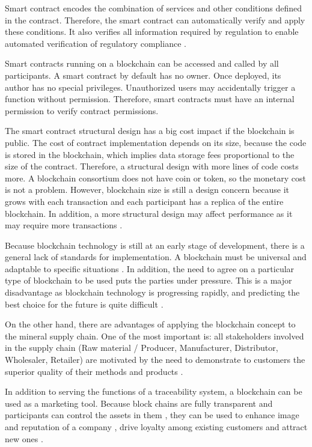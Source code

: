 Smart contract encodes the combination of services and other conditions defined in the contract. Therefore, the smart contract can automatically verify and apply these conditions. It also verifies all information required by regulation to enable automated verification of regulatory compliance \cite{lu2017adaptable}. 

Smart contracts running on a blockchain can be accessed and called by all participants. A smart contract by default has no owner. Once deployed, its author has no special privileges. Unauthorized users may accidentally trigger a function without permission. Therefore, smart contracts must have an internal permission to verify contract permissions.

The smart contract structural design has a big cost impact if the blockchain is public. The cost of contract implementation depends on its size, because the code is stored in the blockchain, which implies data storage fees proportional to the size of the contract. Therefore, a structural design with more lines of code costs more. A blockchain consortium does not have coin or token, so the monetary cost is not a problem. However, blockchain size is still a design concern because it grows with each transaction and each participant has a replica of the entire blockchain. In addition, a more structural design may affect performance as it may require more transactions \cite{lu2017adaptable}.

Because blockchain technology is still at an early stage of development, there is a general lack of standards for implementation. A blockchain must be universal and adaptable to specific situations \cite{valenta2017comparison}. In addition, the need to agree on a particular type of blockchain to be used puts the parties under pressure. This is a major disadvantage as blockchain technology is progressing rapidly, and predicting the best choice for the future is quite difficult \cite{galvez2018future}.

On the other hand, there are advantages of applying the blockchain concept to the mineral supply chain. One of the most important is: all stakeholders involved in the supply chain (Raw material / Producer, Manufacturer, Distributor, Wholesaler, Retailer) are motivated by the need to demonstrate to customers the superior quality of their methods and products \cite{lu2017adaptable}. 

In addition to serving the functions of a traceability system, a blockchain can be used as a marketing tool. Because block chains are fully transparent\cite{iansiti2017truth} and participants can control the assets in them \cite{liao2011food}, they can be used to enhance image and reputation of a company \cite{van2007essentials}, drive loyalty among existing customers \cite{pizzuti2015global} and attract new ones \cite{svensson2009transparency}. 

